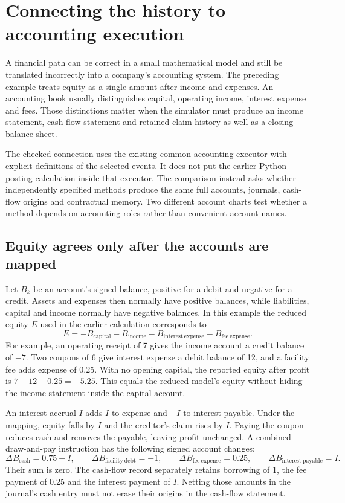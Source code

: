 \section{Connecting the history to accounting execution}
\label{sim:guarded-memory-execution}

A financial path can be correct in a small mathematical model and still be translated incorrectly into a company's accounting system. The preceding example treats equity as a single amount after income and expenses. An accounting book usually distinguishes capital, operating income, interest expense and fees. Those distinctions matter when the simulator must produce an income statement, cash-flow statement and retained claim history as well as a closing balance sheet.

The checked connection uses the existing common accounting executor with explicit definitions of the selected events. It does not put the earlier Python posting calculation inside that executor. The comparison instead asks whether independently specified methods produce the same full accounts, journals, cash-flow origins and contractual memory. Two different account charts test whether a method depends on accounting roles rather than convenient account names.

\subsection{Equity agrees only after the accounts are mapped}

Let $B_k$ be an account's signed balance, positive for a debit and negative for a credit. Assets and expenses then normally have positive balances, while liabilities, capital and income normally have negative balances. In this example the reduced equity $E$ used in the earlier calculation corresponds to
\begin{equation}
 E=-B_{\mathrm{capital}}-B_{\mathrm{income}}
   -B_{\mathrm{interest\ expense}}-B_{\mathrm{fee\ expense}}.
\end{equation}
For example, an operating receipt of 7 gives the income account a credit balance of $-7$. Two coupons of 6 give interest expense a debit balance of 12, and a facility fee adds expense of 0.25. With no opening capital, the reported equity after profit is $7-12-0.25=-5.25$. This equals the reduced model's equity without hiding the income statement inside the capital account.

An interest accrual $I$ adds $I$ to expense and $-I$ to interest payable. Under the mapping, equity falls by $I$ and the creditor's claim rises by $I$. Paying the coupon reduces cash and removes the payable, leaving profit unchanged. A combined draw-and-pay instruction has the following signed account changes:
\begin{equation}
 \Delta B_{\mathrm{cash}}=0.75-I,\qquad
 \Delta B_{\mathrm{facility\ debt}}=-1,\qquad
 \Delta B_{\mathrm{fee\ expense}}=0.25,\qquad
 \Delta B_{\mathrm{interest\ payable}}=I.
\end{equation}
Their sum is zero. The cash-flow record separately retains borrowing of 1, the fee payment of 0.25 and the interest payment of $I$. Netting those amounts in the journal's cash entry must not erase their origins in the cash-flow statement.

